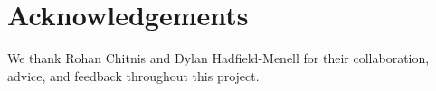 \section{Acknowledgements}
We thank Rohan Chitnis and Dylan Hadfield-Menell for their collaboration, advice, and feedback
throughout this project.